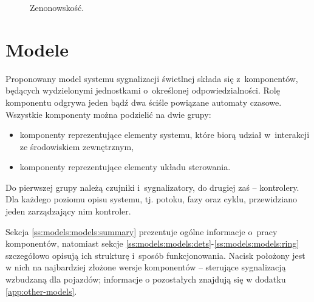 \documentclass{pracamgr}
\theoremstyle{plain}
\begin{document}
\begin{figure}
  \centering
  \hspace{1in}
  \caption{Zenonowskość.}
  \label{img:models-zeno}
\end{figure}

\section{Modele}
\label{s:models:models}
Proponowany model systemu sygnalizacji świetlnej składa się
z~komponentów, będących wydzielonymi jednostkami o~określonej
odpowiedzialności. Rolę komponentu odgrywa jeden bądź dwa ściśle
powiązane automaty czasowe. Wszystkie komponenty można podzielić na
dwie grupy:
\begin{itemize}
  \item komponenty reprezentujące elementy systemu, które biorą udział
  w~interakcji ze środowiskiem zewnętrznym,
  \item komponenty reprezentujące elementy układu sterowania.
\end{itemize}
Do pierwszej grupy należą czujniki i~sygnalizatory, do drugiej zaś --
kontrolery. Dla każdego poziomu opisu systemu, tj. potoku, fazy oraz
cyklu, przewidziano jeden zarządzający nim kontroler.

Sekcja \ref{ss:models:models:summary} prezentuje ogólne informacje
o~pracy komponentów, natomiast sekcje
\ref{ss:models:models:dets}-\ref{ss:models:models:ring} szczegółowo
opisują ich strukturę i~sposób funkcjonowania. Nacisk położony jest w
nich na najbardziej złożone wersje komponentów -- sterujące
sygnalizacją wzbudzaną dla pojazdów; informacje o pozostałych znajdują
się w dodatku \ref{app:other-models}.
\end{document}
